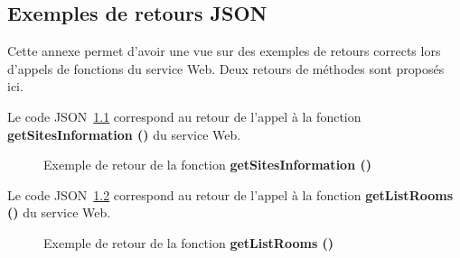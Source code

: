 \begin{appendices}
\chapter{Exemples de retours JSON}
\label{chapterAnnexe:exempleJSON}

Cette annexe permet d'avoir une vue sur des exemples de retours corrects lors d'appels de fonctions du service Web.
Deux retours de m\'ethodes sont propos\'es ici.

Le code JSON~\ref{annexe:getsitesinformation} correspond au retour de l'appel \`a la fonction \textbf{getSitesInformation ()} du service Web.

\begin{figure}[!ht]
	\centering
	
	\caption{Exemple de retour de la fonction \textbf{getSitesInformation ()}}
	\label{annexe:getsitesinformation}

\end{figure}

\clearpage

Le code JSON~\ref{annexe:getlistrooms} correspond au retour de l'appel \`a la fonction \textbf{getListRooms ()} du service Web.

\begin{figure}[!ht]
	\centering
	
	\caption{Exemple de retour de  la fonction \textbf{getListRooms ()}}
	\label{annexe:getlistrooms}

\end{figure}

\end{appendices}

\clearpage
